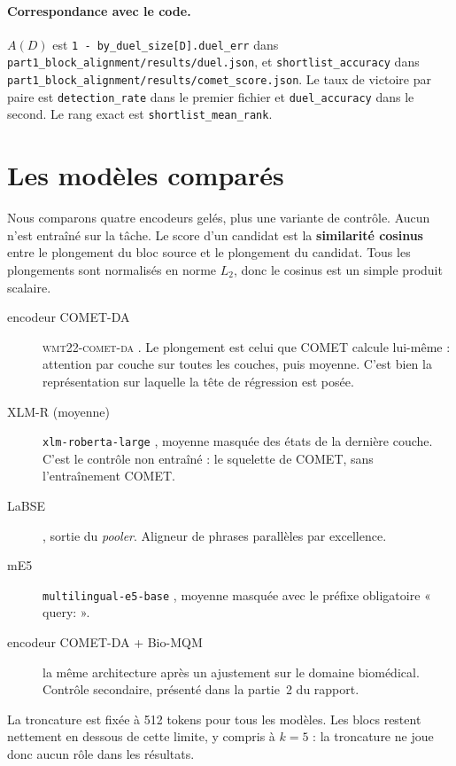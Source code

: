 \documentclass[11pt]{article}
\newcommand{\cometda}{\textsc{wmt22-comet-da}}
\newcommand{\code}[1]{\texttt{\small #1}}
\begin{document}
\paragraph{Correspondance avec le code.}
$A(D)$ est \code{1 - by\_duel\_size[D].duel\_err} dans \code{part1\_block\_alignment/results/duel.json}, et \code{shortlist\_accuracy} dans \code{part1\_block\_alignment/results/comet\_score.json}.
Le taux de victoire par paire est \code{detection\_rate} dans le premier fichier et \code{duel\_accuracy} dans le second.
Le rang exact est \code{shortlist\_mean\_rank}.

\section{Les modèles comparés}

Nous comparons quatre encodeurs gelés, plus une variante de contrôle.
Aucun n'est entraîné sur la tâche.
Le score d'un candidat est la \textbf{similarité cosinus} entre le plongement du bloc source et le plongement du candidat.
Tous les plongements sont normalisés en norme $L_2$, donc le cosinus est un simple produit scalaire.

\begin{description}
\item[encodeur COMET-DA] \cometda{} \citep{rei2022comet}. Le plongement est celui que COMET calcule lui-même : attention par couche sur toutes les couches, puis moyenne. C'est bien la représentation sur laquelle la tête de régression est posée.
\item[XLM-R (moyenne)] \code{xlm-roberta-large} \citep{conneau2020xlmr}, moyenne masquée des états de la dernière couche. C'est le contrôle non entraîné : le squelette de COMET, sans l'entraînement COMET.
\item[LaBSE] \citep{feng2022labse}, sortie du \emph{pooler}. Aligneur de phrases parallèles par excellence.
\item[mE5] \code{multilingual-e5-base} \citep{wang2022e5,wang2024me5}, moyenne masquée avec le préfixe obligatoire « query: ».
\item[encodeur COMET-DA + Bio-MQM] la même architecture après un ajustement sur le domaine biomédical. Contrôle secondaire, présenté dans la partie~2 du rapport.
\end{description}

La troncature est fixée à 512 tokens pour tous les modèles.
Les blocs restent nettement en dessous de cette limite, y compris à $k=5$ : la troncature ne joue donc aucun rôle dans les résultats.
\end{document}
